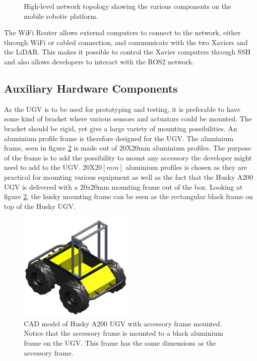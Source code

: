 \begin{figure}[htp!]
    \fontsize{8.5}{14}\selectfont
    \centering
    
    \caption{High-level network topology showing the various components on the mobile robotic platform.}
    \label{fig:M:HA:NetworkTopology}
\end{figure}

The WiFi Router allows external computers to connect to the network, either through WiFi or cabled connection, and communicate with the two Xaviers and the LiDAR. This makes it possible to control the Xavier computers through SSH and also allows developers to interact with the ROS2 network.


\subsection{Auxiliary Hardware Components} \label{sec:M:HA:AuxiliaryHardware}
As the UGV is to be used for prototyping and testing, it is preferable to have some kind of bracket where various sensors and actuators could be mounted. The bracket should be rigid, yet give a large variety of mounting possibilities. An aluminium profile frame is therefore designed for the UGV. The aluminium frame, seen in figure \ref{fig:M:H:AMF:userFrame} is made out of 20X20mm aluminium profiles. The purpose of the frame is to add the possibility to mount any accessory the developer might need to add to the UGV. 20X20$[mm]$ aluminium profiles is chosen as they are practical for mounting various equipment as well as the fact that the Husky A200 UGV is delivered with a 20x20mm mounting frame out of the box. Looking at figure \ref{fig:M:H:AMF:userFrame}, the husky mounting frame can be seen as the rectangular black frame on top of the Husky UGV.

\begin{figure}[htp!]
  \centering
  \includegraphics[width = 0.5\textwidth]{Figures/husky_with_frame.png}
  \caption{CAD model of Husky A200 UGV with accessory frame mounted. Notice that the accessory frame is mounted to a black aluminium frame on the UGV. This frame has the same dimensions as the accessory frame.}
  \label{fig:M:H:AMF:userFrame}
\end{figure}

